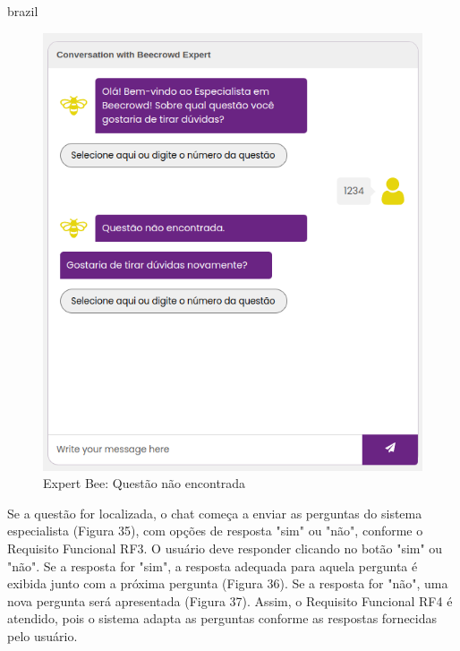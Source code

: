 \begin{otherlanguage*}{brazil}
\begin{figure}[H]
    \centering
            \caption{Expert Bee: Questão não encontrada}
            \label{fig:ModeloConceitual}
        \includegraphics[scale=0.63]{pictures/desenvolvimento/exepert_bee_questao_nao_encontrada.png}
\end{figure}

Se a questão for localizada, o chat começa a enviar as perguntas do sistema especialista (Figura 35), com opções de resposta "sim" ou "não", conforme o Requisito Funcional RF3. O usuário deve responder clicando no botão "sim" ou "não". Se a resposta for "sim", a resposta adequada para aquela pergunta é exibida junto com a próxima pergunta (Figura 36). Se a resposta for "não", uma nova pergunta será apresentada (Figura 37). Assim, o Requisito Funcional RF4 é atendido, pois o sistema adapta as perguntas conforme as respostas fornecidas pelo usuário.


\end{otherlanguage*}
